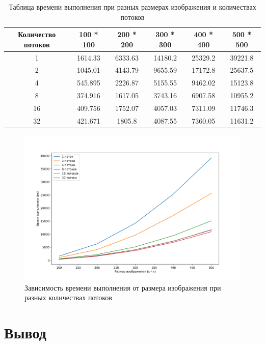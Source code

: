 \documentclass[12pt]{report}
\begin{document}
\begin{table} [h!]
    \label{tableComp}
	\caption{Таблица времени выполнения при разных размерах изображения и количествах потоков}
	\begin{center}
		\begin{tabular}{|c c c c c c|} 
			\hline
			Количество потоков &  100 * 100 & 200 * 200 & 300 * 300 & 400 * 400 & 500 * 500 \\  
            \hline
            1 & 1614.33 & 6333.63 & 14180.2 & 25329.2 & 39221.8\\
            \hline
            2 & 1045.01 & 4143.79 & 9655.59 & 17172.8 & 25637.5\\
            \hline
            4 & 545.895 & 2226.87 & 5155.55 & 9462.02 & 15123.8\\
            \hline
            8 & 374.916 & 1617.05 & 3743.16 & 6907.58 & 10955.2\\
            \hline
            16 & 409.756 & 1752.07 & 4057.03 & 7311.09 & 11746.3\\
            \hline
            32 & 421.671 & 1805.8 & 4087.55 & 7360.05 & 11631.2\\
			\hline
		\end{tabular}
	\end{center}
\end{table}
\newpage
\begin{figure}[h!p]
	\centering
	\includegraphics[scale = 0.7]{threadsComp.png}
	\caption{Зависимость времени выполнения от размера изображения при разных количествах потоков}
	\label{imageComp}
\end{figure}

\section{Вывод}
\end{document}
